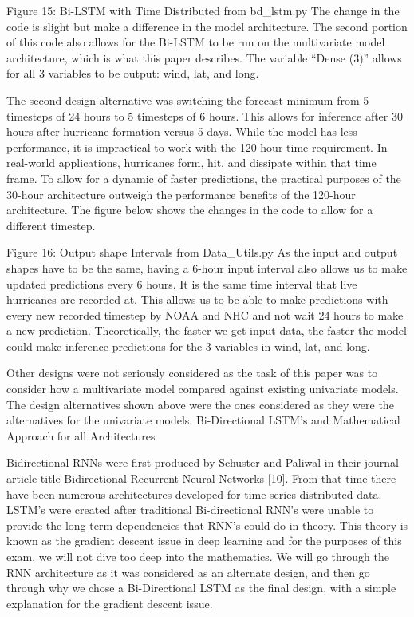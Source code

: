 \documentclass{article}
\begin{document}
Figure 15: Bi-LSTM with Time Distributed from bd\_lstm.py
The change in the code is slight but make a difference in the model architecture. The second portion of this code also allows for the Bi-LSTM to be run on the multivariate model architecture, which is what this paper describes. The variable “Dense (3)” allows for all 3 variables to be output: wind, lat, and long.

The second design alternative was switching the forecast minimum from 5 timesteps of 24 hours to 5 timesteps of 6 hours. This allows for inference after 30 hours after hurricane formation versus 5 days. While the model has less performance, it is impractical to work with the 120-hour time requirement. In real-world applications, hurricanes form, hit, and dissipate within that time frame. To allow for a dynamic of faster predictions, the practical purposes of the 30-hour architecture outweigh the performance benefits of the 120-hour architecture. The figure below shows the changes in the code to allow for a different timestep.

Figure 16: Output shape Intervals from Data\_Utils.py
As the input and output shapes have to be the same, having a 6-hour input interval also allows us to make updated predictions every 6 hours. It is the same time interval that live hurricanes are recorded at. This allows us to be able to make predictions with every new recorded timestep by NOAA and NHC and not wait 24 hours to make a new prediction. Theoretically, the faster we get input data, the faster the model could make inference predictions for the 3 variables in wind, lat, and long. 

Other designs were not seriously considered as the task of this paper was to consider how a multivariate model compared against existing univariate models. The design alternatives shown above were the ones considered as they were the alternatives for the univariate models.
Bi-Directional LSTM’s and Mathematical Approach for all Architectures

Bidirectional RNNs were first produced by Schuster and Paliwal in their journal article title Bidirectional Recurrent Neural Networks [10]. %
From that time there have been numerous architectures developed for time series distributed data. LSTM’s were created after traditional Bi-directional RNN’s were unable to provide the long-term dependencies that RNN’s could do in theory. This theory is known as the gradient descent issue in deep learning and for the purposes of this exam, we will not dive too deep into the mathematics. We will go through the RNN architecture as it was considered as an alternate design, and then go through why we chose a Bi-Directional LSTM as the final design, with a simple explanation for the gradient descent issue.
\end{document}
